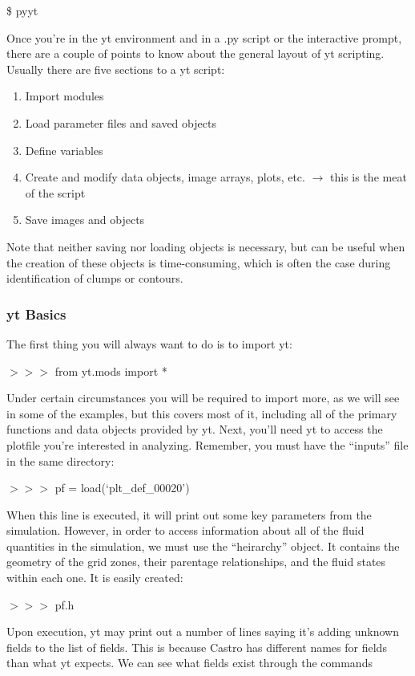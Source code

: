 \$ pyyt

Once you're in the yt environment and in a .py script or the
interactive prompt, there are a couple of points to know about the
general layout of yt scripting. Usually there are five sections to a
yt script:
\begin{enumerate}
\item
\indent Import modules
\item
\indent Load parameter files and saved objects
\item
\indent Define variables
\item
\indent Create and modify data objects, image arrays, plots,
etc. $\rightarrow$ this is the meat of the script
\item
\indent Save images and objects
\end{enumerate}

Note that neither saving nor loading objects is necessary, but can be
useful when the creation of these objects is time-consuming, which is
often the case during identification of clumps or contours.

\subsubsection{yt Basics}

The first thing you will always want to do is to import yt:

{{\scriptsize$>>>$}} from yt.mods import *

Under certain circumstances you will be required to import more, as we
will see in some of the examples, but this covers most of it,
including all of the primary functions and data objects provided by
yt. Next, you'll need yt to access the plotfile you're interested in
analyzing. Remember, you must have the ``inputs'' file in the same
directory:

{\scriptsize$>>>$} pf = load(`plt\_def\_00020')

When this line is executed, it will print out some key parameters from
the simulation. However, in order to access information about all of
the fluid quantities in the simulation, we must use the ``heirarchy''
object. It contains the geometry of the grid zones, their parentage
relationships, and the fluid states within each one. It is easily
created:

{\scriptsize$>>>$} pf.h

Upon execution, yt may print out a number of lines saying it's adding
unknown fields to the list of fields. This is because Castro has
different names for fields than what yt expects. We can see what
fields exist through the commands

